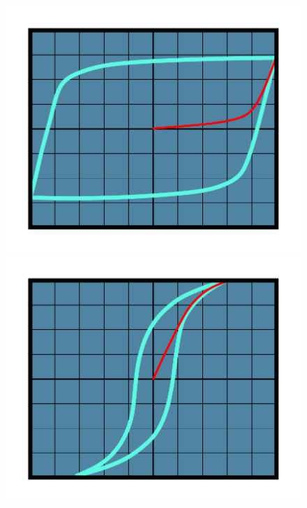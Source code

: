 \documentclass[12pt, a4paper]{article}
\begin{document}
\begin{figure}[H]
  \begin{minipage}{.33\textwidth}
    \centering
    \includegraphics[width=.95\linewidth]{pics/permalloy.pdf}
  \end{minipage}%
  \begin{minipage}{.33\textwidth}
    \centering
    \includegraphics[width=.95\linewidth]{pics/FeSi.pdf}
  \end{minipage}%
  \begin{minipage}{.33\textwidth}
    \centering

\end{minipage}
\end{figure}
\end{document}

